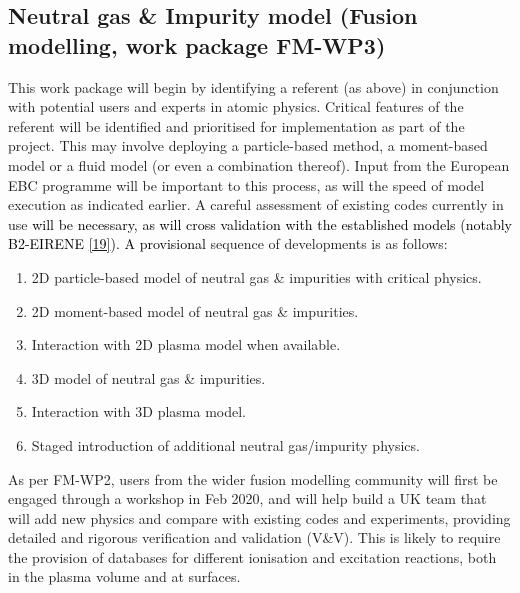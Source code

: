 \documentclass[a4paper]{article}
\newcommand\textstyleInternetlink[1]{\textcolor{blue}{#1}}
\newcommand\liststyleWWNumxi{%
\renewcommand\theenumi{\arabic{enumi}}
\renewcommand\theenumii{\alph{enumii}}
\renewcommand\theenumiii{\roman{enumiii}}
\renewcommand\theenumiv{\arabic{enumiv}}
\renewcommand\labelenumi{\theenumi.}
\renewcommand\labelenumii{\theenumii.}
\renewcommand\labelenumiii{\theenumiii.}
\renewcommand\labelenumiv{\theenumiv.}
}
\begin{document}
\subsection[Neutral gas \& Impurity model (Fusion modelling, work package
FM{}-WP3)]{\textbf{\textcolor[rgb]{0.12156863,0.28627452,0.49019608}{Neutral gas \& Impurity
model}}\textcolor[rgb]{0.12156863,0.28627452,0.49019608}{ (Fusion modelling, work package
}\textbf{\textcolor[rgb]{0.12156863,0.28627452,0.49019608}{FM-WP3}}\textcolor[rgb]{0.12156863,0.28627452,0.49019608}{)}}

\bigskip

This work package will begin by identifying a referent (as above) in conjunction with potential users and experts in
atomic physics. Critical features of the referent will be identified and prioritised for implementation as part of the
project. This may involve deploying a particle-based method, a moment-based model or a fluid model (or even a
combination thereof). Input from the European EBC programme will be important to this process, as will the speed of
model execution as indicated earlier. A careful assessment of existing codes currently in use \textcolor{black}{will be
necessary, as will cross validation with the established models (notably B2-EIRENE
}\href{https://www.tandfonline.com/doi/abs/10.13182/FST47-172}{\textstyleInternetlink{\textcolor{black}{[19]}}}\textcolor{black}{).
A provisional }sequence of developments is as follows:


\bigskip

\liststyleWWNumxi
\begin{enumerate}
\item 2D particle-based model of neutral gas \& impurities with critical physics.
\item 2D moment-based model of neutral gas \& impurities.
\item Interaction with 2D plasma model when available.
\item 3D model of neutral gas \& impurities.
\item Interaction with 3D plasma model.
\item Staged introduction of additional neutral gas/impurity physics.
\end{enumerate}

\bigskip

As per FM-WP2, users from the wider fusion modelling community will first be engaged through a workshop in Feb 2020, and
will help build a UK team that will add new physics and compare with existing codes and experiments, providing detailed
and rigorous verification and validation (V\&V). This is likely to require the provision of databases for different
ionisation and excitation reactions, both in the plasma volume and at surfaces.
\end{document}

